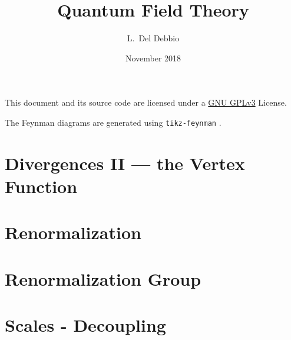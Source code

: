 \documentclass[bibliography=totoc]{notes}
\title{Quantum Field Theory}
\author{L.~Del Debbio}
\date{November 2018}
\begin{document}
%
\maketitle
\clearpage
\clearpage
\tableofcontents

\vspace{\fill}

This document and its source code are licensed under a \href{https://www.gnu.org/licenses/gpl-3.0.en.html}{GNU GPLv3} License.

The Feynman diagrams are generated using \texttt{tikz-feynman} \parencite{ELLIS2017103}.

\nocite{*}
\printbibliography[keyword=recommended,title={Recommended Textbooks},omitnumbers=true]





%






\chapter{Divergences II --- the Vertex Function}
\label{cha:diverg-ii-vert}


\chapter{Renormalization}
\label{cha:renormalization}
% 


\chapter{Renormalization Group}
\label{cha:renorm-group}

\chapter{Scales - Decoupling}
\label{cha:scales-decoupling}

\printindex
\printbibliography[notkeyword=recommended]
\end{document}
